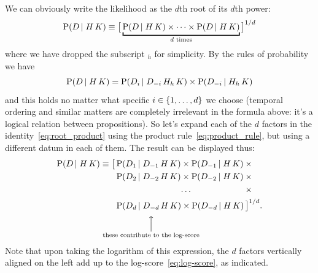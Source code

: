 \documentclass[\ifafour a4paper,12pt,\else a5paper,10pt,\fi%
onecolumn,oneside,article,%
british%
]{memoir}
\theoremstyle{remark}
\theoremstyle{innote}
\DeclarePairedDelimiter\set{\{}{\}}
\newcommand*{\p}{\mathrm{P}}%
\renewcommand*{\|}[1][]{\nonscript\,#1\vert\nonscript\;\mathopen{}}
\newcommand*{\yK}{K}
\begin{document}
We can obviously write the likelihood as the $d$th root of its $d$th power:
\begin{equation}
  \label{eq:root_product}
  \p(D \| H \, \yK) \equiv  \bigl[\,
  \underbracket{\p(D \| H \, \yK) \times \dotsm \times
  \p(D \| H \, \yK)}_{\text{$d$ times}}
  \,\bigr]^{1/d}
\end{equation}
where we have dropped the subscript ${}_{h}$ for simplicity. By the rules
of probability we have
\begin{equation}
  \label{eq:product_rule}
  \p(D \| H \, \yK) =
  \p(D_{i} \| D_{-i} \, H_{h} \, \yK) \times \p(D_{-i} \|  H_{h} \, \yK)
\end{equation}
and this holds no matter what specific $i \in \set{1, \dotsc,
  d}$ we choose (temporal ordering and similar matters are completely
irrelevant in the formula above: it's a logical relation between
propositions). So let's expand each of the $d$ factors in the
identity~\eqref{eq:root_product} using the product
rule~\eqref{eq:product_rule}, but using a different datum in each of them.
The result can be displayed thus:
\begin{equation}
  \label{eq:product_2}
  \begin{aligned}
    \p(D \| H \, \yK) \equiv{}
    \bigl[\,&\p(D_{1} \| D_{-1} \, H \, \yK) \times
            \p(D_{-1} \|  H \, \yK) \times{}\\
          &\p(D_{2} \| D_{-2} \, H \, \yK) \times
            \p(D_{-2} \| H \, \yK)\times{}\\
          &\hphantom{\p(D_{2} \| D_{-2} \, H \, \yK)}
            \mathrlap{\dotso}\hphantom{{}\times  \p(D_{-2} \| H \, \yK)}\times{}\\
          &\p(D_{d} \|\underbracket[0pt][1ex]{ D_{-d} }_{\mathclap{
            \begin{smallmatrix}
              \Big\uparrow\\\text{these contribute to the log-score}
            \end{smallmatrix}
}} H \, \yK) \times\p(D_{-d} \|  H \, \yK)
            \,\bigr]^{1/d}.
  \end{aligned}
\end{equation}
Note that upon taking the logarithm of this expression, the $d$ factors
vertically aligned on the left add up to the
log-score~\eqref{eq:log-score}, as indicated.
\end{document}
